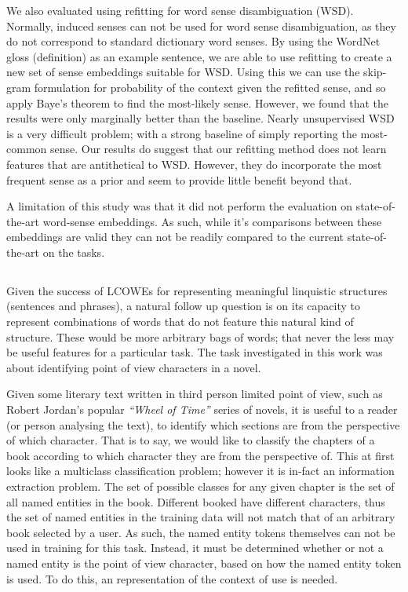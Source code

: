 \documentclass{book}
\begin{document}
We also evaluated using refitting for word sense disambiguation (WSD).
Normally, induced senses can not be used for word sense disambiguation, as they do not correspond to standard dictionary word senses.
By using the WordNet gloss (definition) as an example sentence, we are able to use refitting to create a new set of sense embeddings suitable for WSD.
Using this we can use the skip-gram formulation for probability of the context given the  refitted sense, and so apply Baye's theorem to find the most-likely sense.
However, we found that the results were only marginally better than the baseline.
Nearly unsupervised WSD is a very difficult problem; with a strong baseline of simply reporting the most-common sense.
Our results do suggest that our refitting method does not learn features that are antithetical to WSD.
However, they do incorporate the most frequent sense as a prior and seem to provide little benefit beyond that.

A limitation of this study was that it did not perform the evaluation on state-of-the-art word-sense embeddings.
As such, while it's comparisons between these embeddings are valid they
can not be readily compared to the current state-of-the-art on the tasks.


\subsection{ }

Given the success of LCOWEs for representing meaningful linquistic structures (sentences and phrases),
a natural follow up question is on its capacity to represent combinations of words that do not feature this natural kind of structure.
These would be more arbitrary bags of words; that never the less may be useful features for a particular task.
The task investigated in this work was about identifying point of view characters in a novel.

Given some literary text written in third person limited point of view, such as Robert Jordan's popular \textit{``Wheel of Time''} series of novels,
it is useful to a reader (or person analysing the text), to identify which sections are from the perspective of which character.
That is to say, we would like to classify the chapters of a book according to which character they are from the perspective of.
This at first looks like a multiclass classification problem;
however it is in-fact an information extraction problem.
The set of possible classes for any given chapter is the set of all named entities in the book.
Different booked have different characters,
thus the set of named entities in the training data will not match that of an arbitrary book selected by a user.
As such, the named entity tokens themselves can not be used in training for this task.
Instead, it must be determined whether or not a named entity is the point of view character, based on how the named entity token is used.
To do this, an representation of the context of use is needed.
\end{document}
